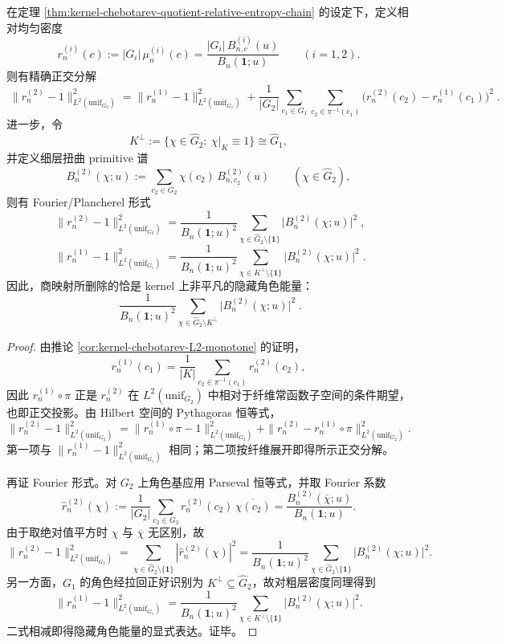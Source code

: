 \begin{theorem}[可见角色能量与隐藏角色能量的正交分解]\label{thm:kernel-chebotarev-visible-hidden-character-energy}
在定理 \ref{thm:kernel-chebotarev-quotient-relative-entropy-chain} 的设定下，定义相对均匀密度
\[
r_n^{(i)}(c):=|G_i|\,\mu_n^{(i)}(c)
=
\frac{|G_i|\,B^{(i)}_{n,c}(u)}{B_n(\mathbf{1};u)}
\qquad(i=1,2).
\]
则有精确正交分解
\[
\boxed{\;
\|r_n^{(2)}-1\|_{L^2(\mathrm{unif}_{G_2})}^2
=
\|r_n^{(1)}-1\|_{L^2(\mathrm{unif}_{G_1})}^2
+
\frac{1}{|G_2|}\sum_{c_1\in G_1}\sum_{c_2\in\pi^{-1}(c_1)}
\bigl(r_n^{(2)}(c_2)-r_n^{(1)}(c_1)\bigr)^2\; }.
\]
进一步，令
\[
K^\perp:=\{\chi\in\widehat G_2:\ \chi|_K\equiv 1\}\cong \widehat G_1,
\]
并定义细层扭曲 primitive 谱
\[
B_n^{(2)}(\chi;u):=\sum_{c_2\in G_2}\chi(c_2)\,B^{(2)}_{n,c_2}(u)
\qquad(\chi\in\widehat G_2),
\]
则有 Fourier/Plancherel 形式
\[
\boxed{\;
\|r_n^{(2)}-1\|_{L^2(\mathrm{unif}_{G_2})}^2
=
\frac{1}{B_n(\mathbf{1};u)^2}
\sum_{\chi\in\widehat G_2\setminus\{\mathbf{1}\}}
\bigl|B_n^{(2)}(\chi;u)\bigr|^2\; },
\]
\[
\boxed{\;
\|r_n^{(1)}-1\|_{L^2(\mathrm{unif}_{G_1})}^2
=
\frac{1}{B_n(\mathbf{1};u)^2}
\sum_{\chi\in K^\perp\setminus\{\mathbf{1}\}}
\bigl|B_n^{(2)}(\chi;u)\bigr|^2\; }.
\]
因此，商映射所删除的恰是 kernel 上非平凡的隐藏角色能量：
\[
\boxed{\;
\frac{1}{B_n(\mathbf{1};u)^2}
\sum_{\chi\in\widehat G_2\setminus K^\perp}
\bigl|B_n^{(2)}(\chi;u)\bigr|^2\; }.
\]
\end{theorem}

\begin{proof}
由推论 \ref{cor:kernel-chebotarev-L2-monotone} 的证明，
\[
r_n^{(1)}(c_1)
=
\frac{1}{|K|}\sum_{c_2\in\pi^{-1}(c_1)}r_n^{(2)}(c_2),
\]
因此 \(r_n^{(1)}\circ\pi\) 正是 \(r_n^{(2)}\) 在 \(L^2(\mathrm{unif}_{G_2})\) 中相对于纤维常函数子空间的条件期望，也即正交投影。由 Hilbert 空间的 Pythagoras 恒等式，
\[
\|r_n^{(2)}-1\|_{L^2(\mathrm{unif}_{G_2})}^2
=
\|r_n^{(1)}\circ\pi-1\|_{L^2(\mathrm{unif}_{G_2})}^2
+
\|r_n^{(2)}-r_n^{(1)}\circ\pi\|_{L^2(\mathrm{unif}_{G_2})}^2.
\]
第一项与 \(\|r_n^{(1)}-1\|_{L^2(\mathrm{unif}_{G_1})}^2\) 相同；第二项按纤维展开即得所示正交分解。
\par
再证 Fourier 形式。对 \(G_2\) 上角色基应用 Parseval 恒等式，并取 Fourier 系数
\[
\widehat r_n^{(2)}(\chi)
:=
\frac{1}{|G_2|}\sum_{c_2\in G_2}r_n^{(2)}(c_2)\,\overline{\chi(c_2)}
=
\frac{B_n^{(2)}(\overline\chi;u)}{B_n(\mathbf{1};u)}.
\]
由于取绝对值平方时 \(\chi\) 与 \(\overline\chi\) 无区别，故
\[
\|r_n^{(2)}-1\|_{L^2(\mathrm{unif}_{G_2})}^2
=
\sum_{\chi\in\widehat G_2\setminus\{\mathbf{1}\}}|\widehat r_n^{(2)}(\chi)|^2
=
\frac{1}{B_n(\mathbf{1};u)^2}
\sum_{\chi\in\widehat G_2\setminus\{\mathbf{1}\}}
\bigl|B_n^{(2)}(\chi;u)\bigr|^2.
\]
另一方面，\(G_1\) 的角色经拉回正好识别为 \(K^\perp\subseteq \widehat G_2\)，故对粗层密度同理得到
\[
\|r_n^{(1)}-1\|_{L^2(\mathrm{unif}_{G_1})}^2
=
\frac{1}{B_n(\mathbf{1};u)^2}
\sum_{\chi\in K^\perp\setminus\{\mathbf{1}\}}
\bigl|B_n^{(2)}(\chi;u)\bigr|^2.
\]
二式相减即得隐藏角色能量的显式表达。证毕。
\end{proof}

\endinput
